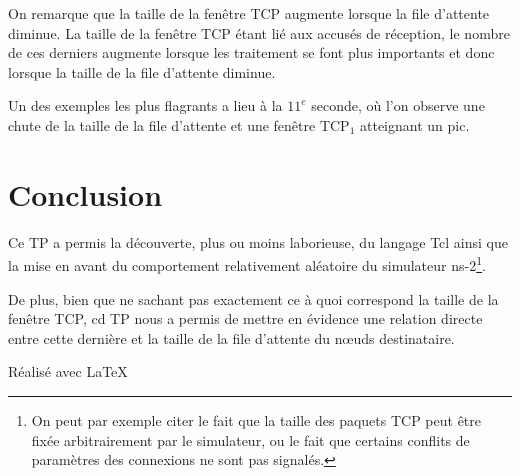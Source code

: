 \documentclass[a4paper]{article}
\begin{document}
On remarque que la taille de la fenêtre TCP augmente lorsque la file d'attente diminue. La taille de
la fenêtre TCP étant lié aux accusés de réception, le nombre de ces derniers augmente lorsque les
traitement se font plus importants et donc lorsque la taille de la file d'attente diminue.

Un des exemples les plus flagrants a lieu à la $11^e$ seconde, où l'on observe une chute de la
taille de la file d'attente et une fenêtre TCP$_1$ atteignant un pic.

\section{Conclusion}

Ce TP a permis la découverte, plus ou moins laborieuse, du langage Tcl ainsi que la mise en avant du
comportement relativement aléatoire du simulateur ns-2\footnote{On peut par exemple citer le fait
	que la taille des paquets TCP peut être fixée arbitrairement par le simulateur, ou le fait que
certains conflits de paramètres des connexions ne sont pas signalés.}.

De plus, bien que ne sachant pas exactement ce à quoi correspond la taille de la fenêtre TCP, cd TP nous a
permis de mettre en évidence une relation directe entre cette dernière et la taille de la file
d'attente du n\oe uds destinataire.


\vfill
{\raggedleft R\'ealis\'e avec \LaTeX{} \par}
\end{document}
